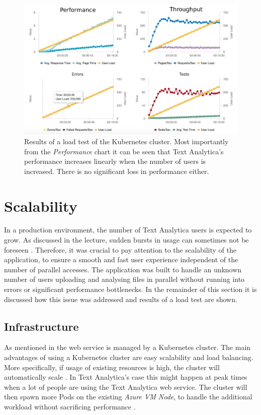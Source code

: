 \documentclass[conference]{IEEEtran}
\begin{document}
\begin{figure}[ht!]
\includegraphics[width=170mm]{img/loadtest_01.png}
\caption{Results of a load test of the Kubernetes cluster. Most importantly from the \textit{Performance} chart it can be seen that Text Analytica's performance increases linearly when the number of users is increased. There is no significant loss in performance either.}
\label{img:loadtesting}
\end{figure}

\section{Scalability}
\label{sec:scalability}
In a production environment, the number of Text Analytica users is expected to grow. As discussed in the lecture, sudden bursts in usage can sometimes not be foreseen \cite{Animoto}. Therefore, it was crucial to pay attention to the scalability of the application, to ensure a smooth and fast user experience independent of the number of parallel accesses. The application was built to handle an unknown number of users uploading and analysing files in parallel without running into errors or significant performance bottlenecks. In the remainder of this section it is discussed how this issue was addressed and results of a load test are shown.

\subsection{Infrastructure}
As mentioned in  the web service is managed by a Kubernetes cluster. The main advantages of using a Kubernetes cluster are easy scalability and load balancing. More specifically, if usage of existing resources is high, the cluster will automatically scale \cite{KubernetesScaling, KubernetesAutoscaler}. In Text Analytica's case this might happen at peak times when a lot of people are using the Text Analytica web service. The cluster will then spawn more Pods on the existing \textit{Azure VM Node}, to handle the additional workload without sacrificing performance \cite{MicrosoftAzureKubernetesService}.
\end{document}
